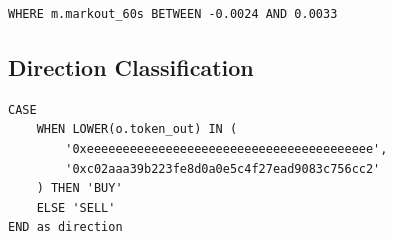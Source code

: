 \documentclass[11pt,a4paper]{article}
\begin{document}
\begin{verbatim}
WHERE m.markout_60s BETWEEN -0.0024 AND 0.0033
\end{verbatim}

\subsection{Direction Classification}

\begin{verbatim}
CASE
    WHEN LOWER(o.token_out) IN (
        '0xeeeeeeeeeeeeeeeeeeeeeeeeeeeeeeeeeeeeeeee',
        '0xc02aaa39b223fe8d0a0e5c4f27ead9083c756cc2'
    ) THEN 'BUY'
    ELSE 'SELL'
END as direction
\end{verbatim}
\end{document}
